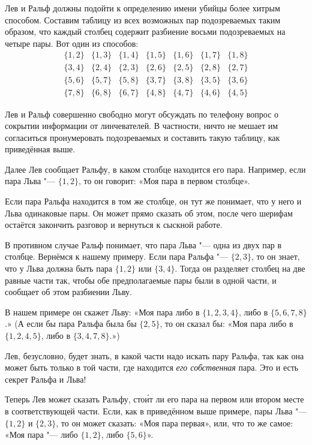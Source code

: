 \documentclass[twoside]{book}
\begin{document}
Лев и Ральф должны подойти к определению имени убийцы более хитрым способом.
Составим таблицу из всех возможных пар подозреваемых таким образом, что каждый столбец содержит разбиение восьми подозреваемых на четыре пары.
Вот один из способов:
\[
\begin{matrix}
\{1,2\}&\{1,3\}&\{1,4\}&\{1,5\}&\{1,6\}&\{1,7\}&\{1,8\}
\\
\{3,4\}&\{2,4\}&\{2,3\}&\{2,6\}&\{2,5\}&\{2,8\}&\{2,7\}
\\
\{5,6\}&\{5,7\}&\{5,8\}&\{3,7\}&\{3,8\}&\{3,5\}&\{3,6\}
\\
\{7,8\}&\{6,8\}&\{6,7\}&\{4,8\}&\{4,7\}&\{4,6\}&\{4,5\}
\end{matrix}
\]


Лев и Ральф совершенно свободно могут обсуждать по телефону вопрос о сокрытии информации от линчевателей.
В частности, ничто не мешает им согласиться пронумеровать подозреваемых и составить такую таблицу, как приведённая выше.

Далее Лев сообщает Ральфу, в каком столбце находится его пара.
Например, если пара Льва "--- $\{1,2\}$, то он говорит: «Моя пара в первом столбце». 

Если пара Ральфа находится в том же столбце, он тут же понимает, что у него и Льва одинаковые пары.
Он может прямо сказать об этом, после чего шерифам остаётся закончить разговор и вернуться к сыскной работе.

В противном случае Ральф понимает, что пара Льва "--- одна из двух пар в столбце.
Вернёмся к нашему примеру.
Если пара Ральфа "--- $\{2,3\}$, то он знает, что у Льва должна быть пара $\{1,2\}$ или $\{3,4\}$.
Тогда он разделяет столбец на две равные части так, чтобы обе предполагаемые пары были в одной части, и сообщает об этом разбиении Льву.

В нашем примере он скажет Льву: «Моя пара либо в $\{1,2,3,4\}$, либо в $\{5,6,7,8\}$.»
(А если бы пара Ральфа была бы $\{2,5\}$, то он сказал бы: «Моя пара либо в $\{1,2,4,5\}$, либо в $\{3,4,7,8\}$.»)

Лев, безусловно, будет знать, в какой части надо искать пару Ральфа, так как она может быть только в той части, где находится \emph{его собственная} пара.
Это и есть секрет Ральфа и Льва!

Теперь Лев может сказать Ральфу, сто\'{и}т ли его пара на первом или втором месте в соответствующей части.
Если, как в приведённом выше примере, пары Льва "--- $\{1,2\}$ и $\{2,3\}$, то он может сказать: «Моя пара первая», или, что то же самое: «Моя пара "--- либо $\{1,2\}$, либо $\{5,6\}$».
\end{document}
